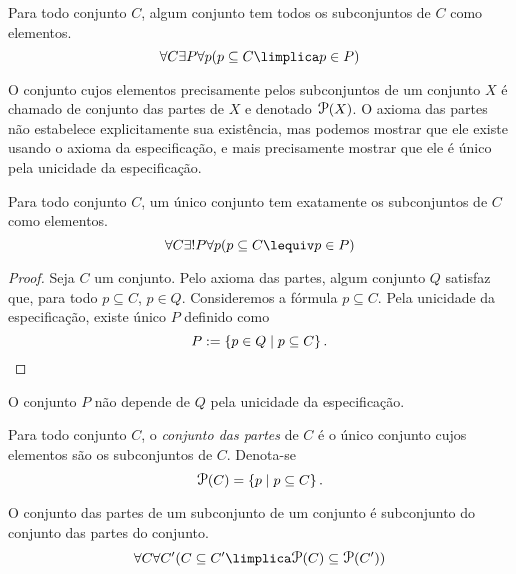 \begin{axi}[Partes]
Para todo conjunto $C$, algum conjunto tem todos os subconjuntos de $C$ como elementos.
	\begin{equation*}
	\forall C \exists P \forall p (p \subseteq C \limplica p \in P)
	\end{equation*}
\end{axi}

O conjunto cujos elementos precisamente pelos subconjuntos de um conjunto $X$ é chamado de conjunto das partes de $X$ e denotado $\p(X)$. O axioma das partes não estabelece explicitamente sua existência, mas podemos mostrar que ele existe usando o axioma da especificação, e mais precisamente mostrar que ele é único pela unicidade da especificação.

\begin{prop}
Para todo conjunto $C$, um único conjunto tem exatamente os subconjuntos de $C$ como elementos.
	\begin{equation*}
	\forall C \exists! P \forall p (p \subseteq C \lequiv p \in P)
	\end{equation*}
\end{prop}
\begin{proof}
Seja $C$ um conjunto. Pelo axioma das partes, algum conjunto $Q$ satisfaz que, para todo $p \subseteq C$, $p \in Q$. Consideremos a fórmula $p \subseteq C$.  Pela unicidade da especificação, existe único $P$ definido como
	\begin{equation*}
	P := \left\{p \in Q \;\middle\vert\; p \subseteq C \right\}. \qedhere
	\end{equation*}
\end{proof}

O conjunto $P$ não depende de $Q$ pela unicidade da especificação.

\begin{defi}
Para todo conjunto $C$, o \emph{conjunto das partes} de $C$ é o único conjunto cujos elementos são os subconjuntos de $C$. Denota-se
	\begin{equation*}
	\p(C) = \set{p}{p \subseteq C}.
	\end{equation*}
\end{defi}

\begin{prop}
O conjunto das partes de um subconjunto de um conjunto é subconjunto do conjunto das partes do conjunto.
	\begin{equation*}
	\forall C \forall C'(C \subseteq C' \limplica \p(C) \subseteq \p(C'))
	\end{equation*}
\end{prop}

